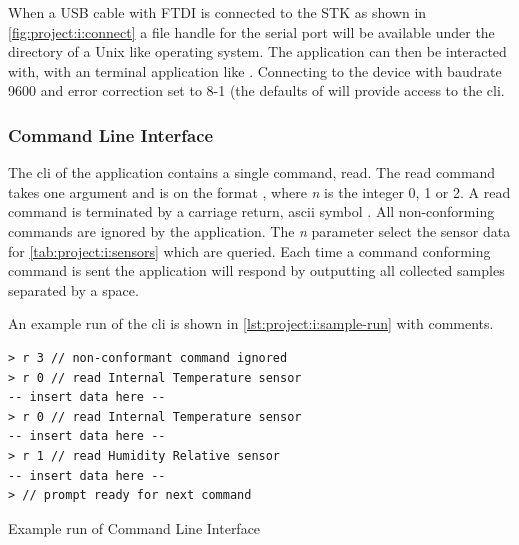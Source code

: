 When a USB cable with FTDI is connected to the STK as shown in \autoref{fig:project:i:connect} a file handle for the serial port will be available under the  directory of a Unix like operating system.
The application can then be interacted with, with an terminal application like .
Connecting to the device with baudrate 9600 and error correction set to 8-1 (the defaults of  will provide access to the {\tracker} \gls{cli}.

\subsubsection{Command Line Interface}
The \gls{cli} of the {\tracker} application contains a single command, read.
The read command takes one argument and is on the format , where \emph{n} is the integer 0, 1 or 2.
A read command is terminated by a carriage return, ascii symbol \code{\\n}.
All non-conforming commands are ignored by the application.
The \emph{n} parameter select the sensor data for \autoref{tab:project:i:sensors} which are queried.
Each time a command conforming command is sent the application will respond by outputting all collected samples separated by a space.

An example run of the \gls{cli} is shown in \autoref{lst:project:i:sample-run} with comments.

\begin{listing}[H]
  \begin{verbatim}
> r 3 // non-conformant command ignored
> r 0 // read Internal Temperature sensor
-- insert data here --
> r 0 // read Internal Temperature sensor
-- insert data here --
> r 1 // read Humidity Relative sensor
-- insert data here --
> // prompt ready for next command
  \end{verbatim}
  \caption{Example run of Command Line Interface}
  \label{lst:project:i:sample-run}
\end{listing}

